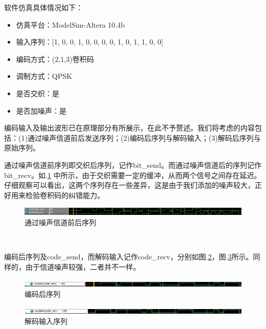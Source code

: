 软件仿真具体情况如下：

\begin{itemize}
\item 仿真平台：ModelSim-Altera 10.4b
\item 输入序列：[1, 0, 0, 1, 0, 0, 0, 0, 1, 0, 1, 1, 0, 0]
\item 编码方式：(2,1,3)卷积码
\item 调制方式：QPSK
\item 是否交织：是
\item 是否加噪声：是
\end{itemize}

编码输入及输出波形已在原理部分有所展示，在此不予赘述。我们将考虑的内容包括：(1)通过噪声信道前后发送序列；(2)编码后序列与解码输入；(3)解码后序列与原始序列。\\


通过噪声信道前序列即交织后序列，记作bit\_send。而通过噪声信道后的序列记作bit\_recv。如.\ref{fig:BitSig} 中所示，由于交织需要一定的缓冲，从而两个信号之间存在延迟。仔细观察可以看出，这两个序列存在一些差异，这是由于我们添加的噪声较大，正好用来检验卷积码的纠错能力。
\begin{figure}[htb]
\centering
\includegraphics[width=1.2\textwidth]{images//BitSig.jpg}
\caption{\label{fig:BitSig}通过噪声信道前后序列}
\end{figure}\\


编码后序列及code\_send，而解码输入记作code\_recv，分别如图.\ref{fig:CodeSend}，图.\ref{fig:CodeRecv}所示。同样的，由于信道噪声较强，二者并不一样。
\begin{figure}[htb]
\centering
\includegraphics[width=1.2\textwidth]{images//CodeSend.jpg}
\caption{\label{fig:CodeSend}编码后序列}
\end{figure}
\begin{figure}[htb]
\centering
\includegraphics[width=1.2\textwidth]{images//CodeRecv.jpg}
\caption{\label{fig:CodeRecv}解码输入序列}
\end{figure}\\

